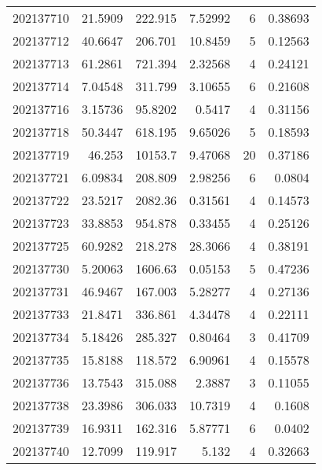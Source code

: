 \begin{tabular}{rrrrrr}
 202137710 &         21.5909  &      222.915  &            7.52992 &           6 & 0.38693 \\
 202137712 &         40.6647  &      206.701  &           10.8459  &           5 & 0.12563 \\
 202137713 &         61.2861  &      721.394  &            2.32568 &           4 & 0.24121 \\
 202137714 &          7.04548 &      311.799  &            3.10655 &           6 & 0.21608 \\
 202137716 &          3.15736 &       95.8202 &            0.5417  &           4 & 0.31156 \\
 202137718 &         50.3447  &      618.195  &            9.65026 &           5 & 0.18593 \\
 202137719 &         46.253   &    10153.7    &            9.47068 &          20 & 0.37186 \\
 202137721 &          6.09834 &      208.809  &            2.98256 &           6 & 0.0804  \\
 202137722 &         23.5217  &     2082.36   &            0.31561 &           4 & 0.14573 \\
 202137723 &         33.8853  &      954.878  &            0.33455 &           4 & 0.25126 \\
 202137725 &         60.9282  &      218.278  &           28.3066  &           4 & 0.38191 \\
 202137730 &          5.20063 &     1606.63   &            0.05153 &           5 & 0.47236 \\
 202137731 &         46.9467  &      167.003  &            5.28277 &           4 & 0.27136 \\
 202137733 &         21.8471  &      336.861  &            4.34478 &           4 & 0.22111 \\
 202137734 &          5.18426 &      285.327  &            0.80464 &           3 & 0.41709 \\
 202137735 &         15.8188  &      118.572  &            6.90961 &           4 & 0.15578 \\
 202137736 &         13.7543  &      315.088  &            2.3887  &           3 & 0.11055 \\
 202137738 &         23.3986  &      306.033  &           10.7319  &           4 & 0.1608  \\
 202137739 &         16.9311  &      162.316  &            5.87771 &           6 & 0.0402  \\
 202137740 &         12.7099  &      119.917  &            5.132   &           4 & 0.32663 \\

\end{tabular}
